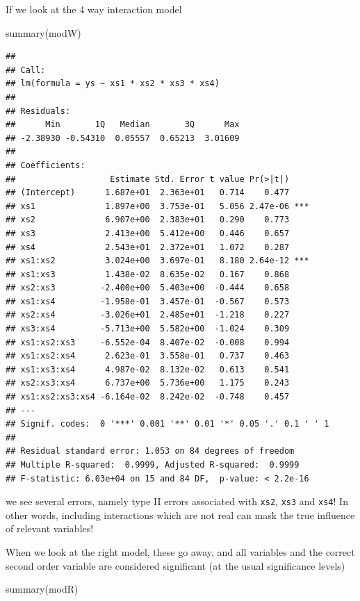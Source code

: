 \documentclass[
]{book}
\newenvironment{Shaded}{\begin{snugshade}}{\end{snugshade}}
\newcommand{\FunctionTok}[1]{\textcolor[rgb]{0.00,0.00,0.00}{#1}}
\newcommand{\NormalTok}[1]{#1}
\begin{document}
If we look at the 4 way interaction model

\begin{Shaded}
\begin{Highlighting}[]
\FunctionTok{summary}\NormalTok{(modW)}
\end{Highlighting}
\end{Shaded}

\begin{verbatim}
## 
## Call:
## lm(formula = ys ~ xs1 * xs2 * xs3 * xs4)
## 
## Residuals:
##      Min       1Q   Median       3Q      Max 
## -2.38930 -0.54310  0.05557  0.65213  3.01609 
## 
## Coefficients:
##                   Estimate Std. Error t value Pr(>|t|)    
## (Intercept)      1.687e+01  2.363e+01   0.714    0.477    
## xs1              1.897e+00  3.753e-01   5.056 2.47e-06 ***
## xs2              6.907e+00  2.383e+01   0.290    0.773    
## xs3              2.413e+00  5.412e+00   0.446    0.657    
## xs4              2.543e+01  2.372e+01   1.072    0.287    
## xs1:xs2          3.024e+00  3.697e-01   8.180 2.64e-12 ***
## xs1:xs3          1.438e-02  8.635e-02   0.167    0.868    
## xs2:xs3         -2.400e+00  5.403e+00  -0.444    0.658    
## xs1:xs4         -1.958e-01  3.457e-01  -0.567    0.573    
## xs2:xs4         -3.026e+01  2.485e+01  -1.218    0.227    
## xs3:xs4         -5.713e+00  5.582e+00  -1.024    0.309    
## xs1:xs2:xs3     -6.552e-04  8.407e-02  -0.008    0.994    
## xs1:xs2:xs4      2.623e-01  3.558e-01   0.737    0.463    
## xs1:xs3:xs4      4.987e-02  8.132e-02   0.613    0.541    
## xs2:xs3:xs4      6.737e+00  5.736e+00   1.175    0.243    
## xs1:xs2:xs3:xs4 -6.164e-02  8.242e-02  -0.748    0.457    
## ---
## Signif. codes:  0 '***' 0.001 '**' 0.01 '*' 0.05 '.' 0.1 ' ' 1
## 
## Residual standard error: 1.053 on 84 degrees of freedom
## Multiple R-squared:  0.9999, Adjusted R-squared:  0.9999 
## F-statistic: 6.03e+04 on 15 and 84 DF,  p-value: < 2.2e-16
\end{verbatim}

we see several errors, namely type II errors associated with \texttt{xs2}, \texttt{xs3} and \texttt{xs4}! In other words, including interactions which are not real can mask the true influence of relevant variables!

When we look at the right model, these go away, and all variables and the correct second order variable are considered significant (at the usual significance levels)

\begin{Shaded}
\begin{Highlighting}[]
\FunctionTok{summary}\NormalTok{(modR)}
\end{Highlighting}
\end{Shaded}
\end{document}
